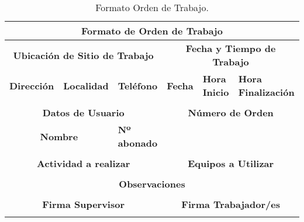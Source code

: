 \begin{table}[H]
  \centering
  \scriptsize
    \begin{tabular}{|c|c|c|c|c|c|}
    \hline
    \multicolumn{6}{|c|}{\cellcolor[HTML]{C5D9F1}\textbf{Formato de Orden de Trabajo}} \bigstrut\\
    \hline
    \multicolumn{3}{|c|}{\textbf{Ubicación de Sitio de Trabajo}} & \multicolumn{3}{c|}{\textbf{Fecha y Tiempo de Trabajo}} \bigstrut\\
    \hline
    \multicolumn{1}{|l|}{\textbf{Dirección}} & \multicolumn{1}{l|}{\textbf{Localidad}} & \multicolumn{1}{l|}{\textbf{Teléfono}} & \multicolumn{1}{l|}{\textbf{Fecha}} & \multicolumn{1}{l|}{\textbf{Hora Inicio}} & \multicolumn{1}{l|}{\textbf{Hora Finalización}} \bigstrut\\
    \hline
    \multirow{2}[2]{*}{} & \multirow{2}[2]{*}{} & \multirow{2}[2]{*}{} & \multirow{2}[2]{*}{} & \multirow{2}[2]{*}{} & \multirow{2}[2]{*}{} \bigstrut[t]\\
          &       &       &       &       &  \bigstrut[b]\\
    \hline
    \multicolumn{3}{|c|}{\textbf{Datos de Usuario}} & \multicolumn{3}{c|}{\textbf{Número de Orden}} \bigstrut\\
    \hline
    \multicolumn{2}{|c|}{\textbf{Nombre}} & \multicolumn{1}{l|}{\textbf{Nº abonado}} & \multicolumn{3}{c|}{\multirow{2}[4]{*}{}} \bigstrut\\
\cline{1-3}    \multicolumn{2}{|c|}{} &       & \multicolumn{3}{c|}{} \bigstrut\\
    \hline
    \multicolumn{3}{|c|}{\textbf{Actividad a realizar}} & \multicolumn{3}{c|}{\textbf{Equipos a Utilizar}} \bigstrut\\
    \hline
    \multicolumn{3}{|c|}{\multirow{2}[2]{*}{}} & \multicolumn{3}{c|}{\multirow{2}[2]{*}{}} \bigstrut[t]\\
    \multicolumn{3}{|c|}{} & \multicolumn{3}{c|}{} \bigstrut[b]\\
    \hline
    \multicolumn{6}{|c|}{\textbf{Observaciones}} \bigstrut\\
    \hline
    \multicolumn{6}{|c|}{\multirow{2}[2]{*}{}} \bigstrut[t]\\
    \multicolumn{6}{|c|}{} \bigstrut[b]\\
    \hline
    \multicolumn{3}{|c|}{\textbf{Firma Supervisor}} & \multicolumn{3}{c|}{\textbf{Firma Trabajador/es}} \bigstrut\\
    \hline
    \multicolumn{3}{|c|}{\multirow{2}[2]{*}{}} & \multicolumn{3}{c|}{\multirow{2}[2]{*}{}} \bigstrut[t]\\
    \multicolumn{3}{|c|}{} & \multicolumn{3}{c|}{} \bigstrut[b]\\
    \hline
    \end{tabular}%
    \caption{Formato Orden de Trabajo.}
  \label{tab:ordentrabajo}%
\end{table}%







